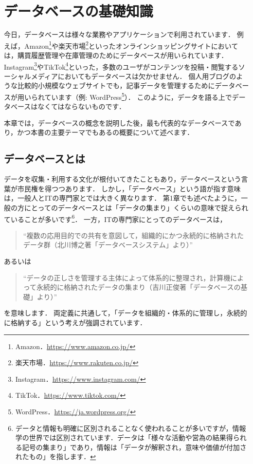 \chapter{データベースの基礎知識}\label{chap:concept-of-database}
今日，データベースは様々な業務やアプリケーションで利用されています．
例えば，Amazon\footnote{Amazon．\url{https://www.amazon.co.jp/}}や楽天市場\footnote{楽天市場．\url{https://www.rakuten.co.jp/}}といったオンラインショッピングサイトにおいては，購買履歴管理や在庫管理のためにデータベースが用いられています．
Instagram\footnote{Instagram．\url{https://www.instagram.com/}}やTikTok\footnote{TikTok．\url{https://www.tiktok.com/}}といった，多数のユーザがコンテンツを投稿・閲覧するソーシャルメディアにおいてもデータベースは欠かせません．
個人用ブログのような比較的小規模なウェブサイトでも，記事データを管理するためにデータベースが用いられています（例: WordPress\footnote{WordPress．\url{https://ja.wordpress.org/}}）．
このように，データを語る上でデータベースはなくてはならないものです．

本章では，データベースの概念を説明した後，最も代表的なデータベースであり，かつ本書の主要テーマでもあるの概要について述べます．


\section{データベースとは}
データを収集・利用する文化が根付いてきたこともあり，データベースという言葉が市民権を得つつあります．
しかし，「データベース」という語が指す意味は，一般人とITの専門家とでは大きく異なります．
第1章でも述べたように，一般の方にとってのデータベースとは「データの集まり」くらいの意味で捉えられていることが多いです\footnote{データと情報も明確に区別されることなく使われることが多いですが，情報学の世界では区別されています．データは「様々な活動や営為の結果得られる記号の集まり」であり，情報は「データが解釈され，意味や価値が付加されたもの」を指します．}．
一方，ITの専門家にとってのデータベースは，
\begin{quote}
``複数の応用目的での共有を意図して，組織的にかつ永続的に格納されたデータ群（北川博之著「データベースシステム」\cite{北川本}より）''
\end{quote}
あるいは
\begin{quote}
``データの正しさを管理する主体によって体系的に整理され，計算機によって永続的に格納されたデータの集まり（吉川正俊著「データベースの基礎」\cite{吉川本}より）''
\end{quote}
を意味します．
両定義に共通して，「データを組織的・体系的に管理し，永続的に格納する」という考えが強調されています．

